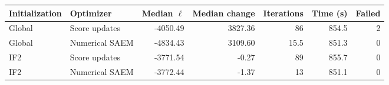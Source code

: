 \begin{tabular}{llrrrrr}
\toprule
Initialization & Optimizer & Median $\ell$ & Median change & Iterations & Time (s) & Failed \\
\midrule
Global & Score updates & -4050.49 & 3827.36 & 86 & 854.5 & 2 \\
Global & Numerical SAEM & -4834.43 & 3109.60 & 15.5 & 851.3 & 0 \\
IF2 & Score updates & -3771.54 & -0.27 & 89 & 855.7 & 0 \\
IF2 & Numerical SAEM & -3772.44 & -1.37 & 13 & 851.1 & 0 \\
\bottomrule
\end{tabular}
